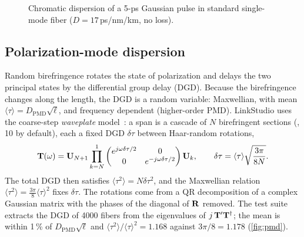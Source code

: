 \begin{figure}[htbp]
\centering
{}
\caption{Chromatic dispersion of a 5-ps Gaussian pulse in standard single-mode fiber
($D=17$\,ps/nm/km, no loss).}
\label{fig:dispersion}
\end{figure}

\subsection{Polarization-mode dispersion}
Random birefringence rotates the state of polarization and delays the two principal states by
the differential group delay (DGD). Because the birefringence changes along the length, the DGD
is a random variable: Maxwellian, with mean $\langle\tau\rangle=D_{\mathrm{PMD}}\sqrt\ell$, and frequency
dependent (higher-order PMD). LinkStudio uses the coarse-step \emph{waveplate}
model~\cite{marcuse1997}: a span is a cascade of $N$ birefringent sections (, 10
by default), each a fixed DGD $\delta\tau$ between Haar-random rotations,
\begin{equation}
  \mathbf{T}(\omega)=\mathbf{U}_{N+1}\prod_{k=N}^{1}\begin{pmatrix}e^{j\omega\delta\tau/2}&0\\0&e^{-j\omega\delta\tau/2}\end{pmatrix}\mathbf{U}_k,
  \qquad \delta\tau=\langle\tau\rangle\sqrt{\frac{3\pi}{8N}} .
\end{equation}
The total DGD then satisfies $\langle\tau^2\rangle=N\delta\tau^2$, and the Maxwellian relation
$\langle\tau^2\rangle=\frac{3\pi}{8}\langle\tau\rangle^2$ fixes $\delta\tau$. The rotations come from a QR
decomposition of a complex Gaussian matrix with the phases of the diagonal of $\mathbf{R}$ removed.
The test suite extracts the DGD of 4000 fibers from the eigenvalues of $j\,\mathbf{T}'\mathbf{T}^\dagger$; the mean is
within 1\,\% of $D_{\mathrm{PMD}}\sqrt\ell$ and $\langle\tau^2\rangle/\langle\tau\rangle^2=1.168$ against $3\pi/8=1.178$
(\cref{fig:pmd}).

